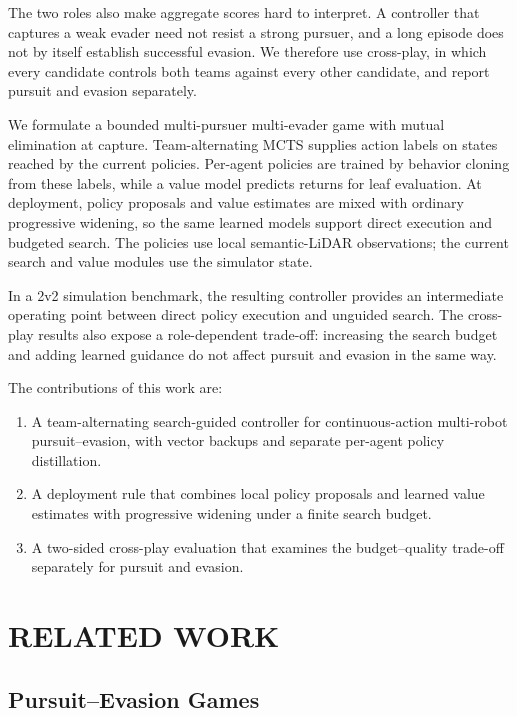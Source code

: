 \documentclass[letterpaper,10pt,conference]{ieeeconf}
\begin{document}
The two roles also make aggregate scores hard to interpret. A controller
that captures a weak evader need not resist a strong pursuer, and a long
episode does not by itself establish successful evasion. We therefore use
cross-play, in which every candidate controls both teams against every
other candidate, and report pursuit and evasion separately.

We formulate a bounded multi-pursuer multi-evader game with mutual
elimination at capture. Team-alternating MCTS supplies action labels on
states reached by the current policies. Per-agent policies are trained by
behavior cloning from these labels, while a value model predicts returns
for leaf evaluation. At deployment, policy proposals and value estimates
are mixed with ordinary progressive widening, so the same learned models
support direct execution and budgeted search. The policies use local
semantic-LiDAR observations; the current search and value modules use the
simulator state.

In a 2v2 simulation benchmark, the resulting controller provides an
intermediate operating point between direct policy execution and
unguided search. The cross-play results also expose a role-dependent
trade-off: increasing the search budget and adding learned guidance do
not affect pursuit and evasion in the same way.

The contributions of this work are:
\begin{enumerate}
  \item A team-alternating search-guided controller for continuous-action
        multi-robot pursuit--evasion, with vector backups and separate
        per-agent policy distillation.
  \item A deployment rule that combines local policy proposals and learned
        value estimates with progressive widening under a finite search
        budget.
  \item A two-sided cross-play evaluation that examines the budget--quality
        trade-off separately for pursuit and evasion.
\end{enumerate}

\section{RELATED WORK}

\subsection{Pursuit--Evasion Games}
\end{document}
